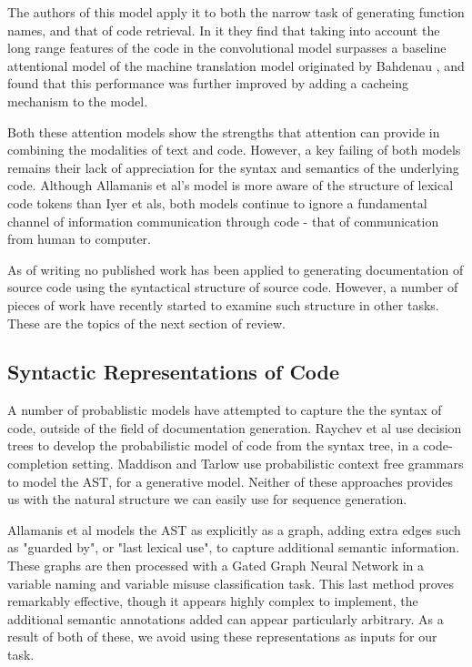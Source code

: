 The authors of this model apply it to both the narrow task of generating function names, and that of code retrieval. In it they find that taking into account the long range features of the code in the convolutional model surpasses a baseline attentional model of the machine translation model originated by Bahdenau \cite{bahdanau_neural_2014}, and found that this performance was further improved by adding a cacheing mechanism to the model.

Both these attention models show the strengths that attention can provide in combining the modalities of text and code. However, a key failing of both models remains their lack of appreciation for the syntax and semantics of the underlying code.
Although Allamanis et al's model is more aware of the structure of lexical code tokens than Iyer et als, both models continue to ignore a fundamental channel of information communication through code - that of communication from human to computer.


As of writing no published work has been applied to generating documentation of source code using the syntactical structure of source code.  However, a number of pieces of work have recently started to examine such structure in other tasks. These are the topics of the next section of review.

\subsection{Syntactic Representations of Code}

A number of probablistic models have attempted to capture the the syntax of code, outside of the field of documentation generation.
Raychev et al \cite{raychev_probabilistic_nodate} use decision trees to develop the probabilistic model of code from the syntax tree, in a code-completion setting. 
Maddison and Tarlow \cite{maddison_structured_2014} use probabilistic context free grammars to model the AST, for a generative model. 
Neither of these approaches provides us with the natural structure we can easily use for sequence generation. 

Allamanis et al models the AST as explicitly as a graph, adding extra edges such as "guarded by", or "last lexical use", to capture additional semantic information\cite{allamanis_learning_2017}. These graphs are then processed with a Gated Graph Neural Network in a variable naming and variable misuse classification task. 
This last method proves remarkably effective, though it appears highly complex to implement, the additional semantic annotations added can appear particularly arbitrary. As a result of both of these, we avoid using these representations as inputs for our task.

